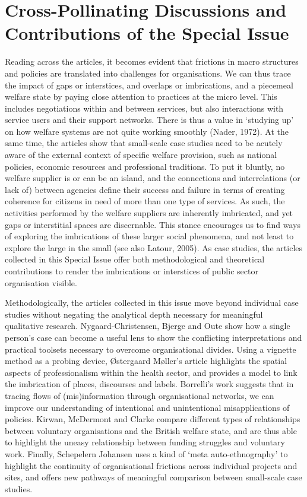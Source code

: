 \chapter{Cross-Pollinating Discussions and Contributions of the Special Issue}
Reading across the articles, it becomes evident that frictions in macro structures and policies are translated into challenges for organisations. We can thus trace the impact of gaps or interstices, and overlaps or imbrications, and a piecemeal welfare state by paying close attention to practices at the micro level. This includes negotiations within and between services, but also interactions with service users and their support networks. There is thus a value in ‘studying up’ on how welfare systems are not quite working smoothly (Nader, 1972). At the same time, the articles show that small-scale case studies need to be acutely aware of the external context of specific welfare provision, such as national policies, economic resources and professional traditions. To put it bluntly, no welfare supplier is or can be an island, and the connections and interrelations (or lack of) between agencies define their success and failure in terms of creating coherence for citizens in need of more than one type of services. As such, the activities performed by the welfare suppliers are inherently imbricated, and yet gaps or interstitial spaces are discernable. This stance encourages us to find ways of exploring the imbrications of these larger social phenomena, and not least to explore the large in the small (see also Latour, 2005). As case studies, the articles collected in this Special Issue offer both methodological and theoretical contributions to render the imbrications or interstices of public sector organisation visible.
\par
Methodologically, the articles collected in this issue move beyond individual case studies without negating the analytical depth necessary for meaningful qualitative research. Nygaard-Christensen, Bjerge and Oute show how a single person’s case can become a useful lens to show the conflicting interpretations and practical toolsets necessary to overcome organisational divides. Using a vignette method as a probing device, Østergaard Møller’s article highlights the spatial aspects of professionalism within the health sector, and provides a model to link the imbrication of places, discourses and labels. Borrelli’s work suggests that in tracing flows of (mis)information through organisational networks, we can improve our understanding of intentional and unintentional misapplications of policies. Kirwan, McDermont and Clarke compare different types of relationships between voluntary organisations and the British welfare state, and are thus able to highlight the uneasy relationship between funding struggles and voluntary work. Finally, Schepelern Johansen uses a kind of ‘meta auto-ethnography’ to highlight the continuity of organisational frictions across individual projects and sites, and offers new pathways of meaningful comparison between small-scale case studies.
